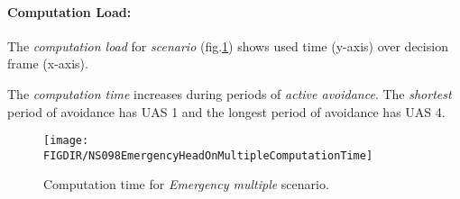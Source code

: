 \paragraph{Computation Load:} The \emph{computation load} for \emph{scenario} (fig.\ref{fig:emergencyHeadOnMultipleComputationTime}) shows used time (y-axis) over decision frame (x-axis).

The \emph{computation time} increases during periods of \emph{active avoidance}. The \emph{shortest} period of avoidance has UAS 1 and the longest period of avoidance has UAS 4.

\begin{figure}[H]
    \centering
    \texttt{[image: \\FIGDIR/NS098EmergencyHeadOnMultipleComputationTime]} 
    \caption{Computation time for \emph{Emergency multiple} scenario.}
    \label{fig:emergencyHeadOnMultipleComputationTime}
\end{figure}

